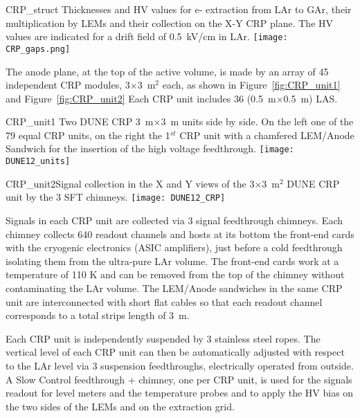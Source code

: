 \begin{cdrfigure}{CRP_struct}
{Thicknesses and HV values for e- extraction from LAr to GAr, their 
multiplication by LEMs and their collection on the X-Y CRP plane. The 
HV values are indicated for a drift field of 0.5~kV/cm in LAr.}
\texttt{[image: CRP\_gaps.png]}
\end{cdrfigure}

The anode plane, at the top of the active volume, is made by an array of 45 independent CRP modules, 3$\times$3~m$^2$ each, as shown in
Figure~\ref{fig:CRP_unit1} and Figure~\ref{fig:CRP_unit2} Each CRP unit includes 36 (0.5~m$\times$0.5~m) LAS.
\begin{cdrfigure}{CRP_unit1} {Two DUNE CRP 3~m$\times$3~m units side by side. On the left one of the 79 equal 
CRP units, on the right the 1$^{st}$ CRP unit with a chamfered LEM/Anode Sandwich  for the insertion of the high voltage feedthrough.}
\texttt{[image: DUNE12\_units]}
\end{cdrfigure}
\begin{cdrfigure}
{CRP_unit2}{Signal collection in the X and Y views of the  3$\times$3~m$^2$ DUNE CRP unit by the 3 SFT chimneys.}
\texttt{[image: DUNE12\_CRP]}
\end{cdrfigure}

Signals in each CRP unit are collected via 3 signal feedthrough chimneys. Each chimney collects 640 readout channels and hosts at its
bottom the front-end cards with the cryogenic electronics (ASIC amplifiers), just before a cold feedthrough isolating them from the
ultra-pure LAr volume. The front-end cards work at a temperature of 110 K and can be removed from the top of the chimney without
contaminating the LAr volume. The LEM/Anode sandwiches in the same CRP unit are interconnected with short flat cables so that each readout
channel corresponds to a total strips length of 3~m.
  
Each CRP unit is independently suspended by 3 stainless steel ropes. The vertical level of each CRP unit can then be automatically
adjusted with respect to the LAr level via 3 suspension feedthroughs, electrically operated from outside. A Slow Control feedthrough +
chimney, one per CRP unit, is used for the signals readout for level meters and the temperature probes and to apply the HV bias on the two
sides of the LEMs and on the extraction grid.

